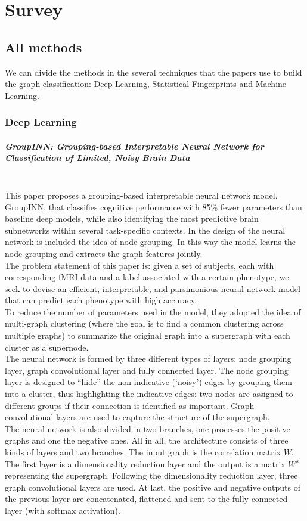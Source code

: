 \chapter{Survey}
\label{chap:2} 

\section{All methods}
We can divide the methods in the several techniques that the papers use to build the graph classification: Deep Learning, Statistical Fingerprints and Machine Learning.

\subsection{Deep Learning}
\paragraph{GroupINN: Grouping-based Interpretable Neural Network for Classification of Limited, Noisy Brain Data}\
\\

This paper proposes a grouping-based interpretable neural network model, GroupINN, that classifies cognitive performance with 85\% fewer parameters than baseline deep models, while also identifying the most predictive brain subnetworks within several task-specific contexts. In the design of the neural network is included the idea of node grouping. In this way the model learns the node grouping and extracts the graph features jointly.
\\
The problem statement of this paper is: given a set of subjects, each with corresponding fMRI data and a label associated with a certain phenotype, we seek to devise an efficient, interpretable, and parsimonious neural network model that can predict each phenotype with high accuracy.
\\
To reduce the number of parameters used in the model, they adopted the idea of multi-graph clustering (where the goal is to find a common clustering across multiple graphs) to summarize the original graph into a supergraph with each cluster as a supernode. 
\\
The neural network is formed by three different types of layers: node grouping layer, graph convolutional layer and fully connected layer. The node grouping layer is designed to “hide” the non-indicative (‘noisy’) edges by grouping them into a cluster, thus highlighting the indicative edges: two nodes are assigned to different groups if their connection is identified as important.
Graph convolutional layers are used to capture the structure of the supergraph.
\\
The neural network is also divided in two branches, one processes the positive graphs and one the negative ones. 
All in all, the architecture consists of three kinds of layers and two branches. 
The input graph is the correlation matrix $W$. The first layer is a dimensionality reduction layer and the output is a matrix $W^{s}$ representing the supergraph. Following the dimensionality reduction layer, three graph convolutional layers are used. At last, the positive and negative outputs of the previous layer are concatenated, flattened and sent to the fully connected layer (with softmax activation).

